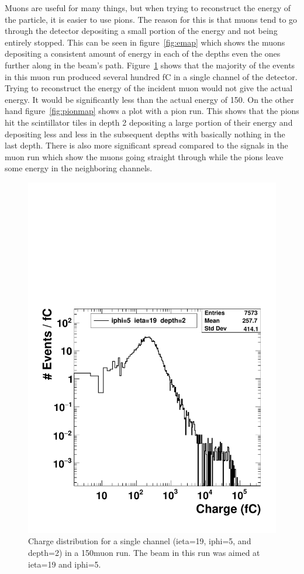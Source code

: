 Muons are useful for many things, but when trying to reconstruct the energy of the particle, it is easier to use pions. The reason for this is that muons tend to go through the detector depositing a small portion of the energy and not being entirely stopped. This can be seen in figure~\ref{fig:emap} which shows the muons depositing a consistent amount of energy in each of the depths even the ones further along in the beam's path. Figure~\ref{fig:Muon} shows that the majority of the events in this muon run produced several hundred fC in a single channel of the detector. Trying to reconstruct the energy of the incident muon would not give the actual energy. It would be significantly less than the actual energy of 150\GeV. On the other hand figure~\ref{fig:pionmap} shows a plot with a pion run. This shows that the pions hit the scintillator tiles in depth 2 depositing a large portion of their energy and depositing less and less in the subsequent depths with basically nothing in the last depth. There is also more significant spread compared to the signals in the muon run which show the muons going straight through while the pions leave some energy in the neighboring channels.

\begin{figure}
\centering
\includegraphics[width=0.7\linewidth]{Figures/MuonCharge.pdf}
\caption{Charge distribution for a single channel (ieta=19, iphi=5, and depth=2) in a 150\GeV\space muon run. The beam in this run was aimed at ieta=19 and iphi=5.}
\label{fig:Muon}
\end{figure}

